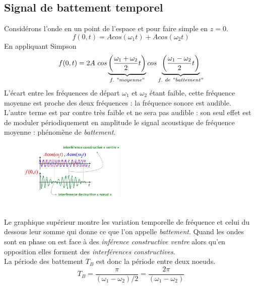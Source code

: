 \documentclass	[11pt, a4paper, openany]{book}
\begin{document}
		\subsection{Signal de battement temporel}
		Considérons l'onde en un point de l'espace et pour faire simple en $z = 0$.
		\begin{equation}
			f(0,t) = Acos(\omega_1 t) + Acos(\omega_2 t)
		\end{equation}
		En appliquant Simpson
		\begin{equation}
			f(0,t) = 2A\ cos\underbrace{\left(\frac{\omega_1 + \omega_2}{2}t\right)}_{f.\ "moyenne"}cos\underbrace{\left(\frac{\omega_1 - \omega_2}{2}t\right)}_{f.\ de\ "battement"}
		\end{equation}
		L'écart entre les fréquences de départ $\omega_1$ et $\omega_2$ étant faible, cette fréquence moyenne est proche des deux fréquences : la fréquence sonore est audible. \\
		L'autre terme est par contre très faible et ne sera pas audible : son seul effet est de moduler périodiquement en amplitude le signal acoustique de fréquence moyenne : phénomène de \textit{battement}.\\
		\begin{figure}
			\includegraphics[width=5cm]{oo/image39.png}
		\end{figure}
		\ \\
		Le graphique supérieur montre les variation temporelle de fréquence et celui du dessous leur somme qui donne ce que l'on appelle \textit{battement}. Quand les ondes sont en phase on est face à des \textit{inférence constructive ventre} alors qu'en opposition elles forment des \textit{interférences constructives}.\\
		
		La période des battement $T_B$ est donc la période entre deux noeuds.
		\begin{equation}
			T_B = \frac{\pi}{(\omega_1 - \omega_2)/2} = \frac{2\pi}{(\omega_1 - \omega_2)}
		\end{equation}
		
\end{document}

